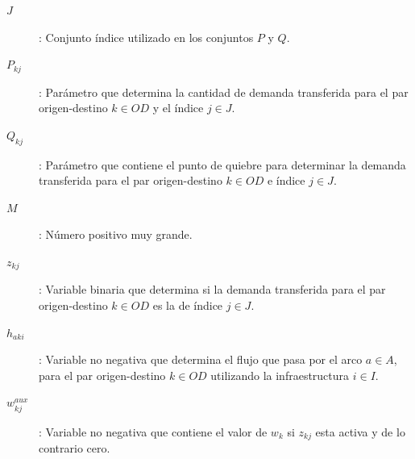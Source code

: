 \documentclass{article}
\begin{document}
  \begin{description}
    \item[$J$]: Conjunto índice utilizado en los conjuntos $P$ y $Q$.
    \item[$P_{kj}$]: Parámetro que determina la cantidad de demanda transferida para el par origen-destino $k \in OD$ y el índice $j \in J$.
    \item[$Q_{kj}$]: Parámetro que contiene el punto de quiebre para determinar la demanda transferida para el par origen-destino $k \in OD$ e índice $j \in J$.
    \item[$M$]: Número positivo muy grande.
    \item[$z_{kj}$]: Variable binaria que determina si la demanda transferida para el par origen-destino $k \in OD$ es la de índice $j \in J$.
    \item[$h_{aki}$]: Variable no negativa que determina el flujo que pasa por el arco $a \in A$, para el par origen-destino $k \in OD$ utilizando la infraestructura $i \in I$.
    \item[$w^{aux}_{kj}$]: Variable no negativa que contiene el valor de $w_{k}$ si $z_{kj}$ esta activa y de lo contrario cero.
  \end{description}
\end{document}
